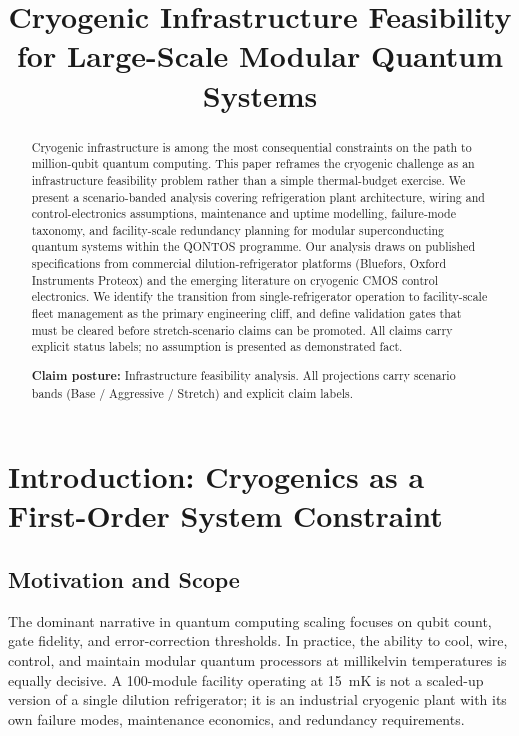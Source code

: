 \documentclass[conference]{IEEEtran}
\begin{document}
\title{Cryogenic Infrastructure Feasibility for Large-Scale Modular Quantum Systems}

\author{\qontosauthor}

\maketitle

\begin{abstract}
Cryogenic infrastructure is among the most consequential constraints on the path to million-qubit quantum computing. This paper reframes the cryogenic challenge as an infrastructure feasibility problem rather than a simple thermal-budget exercise. We present a scenario-banded analysis covering refrigeration plant architecture, wiring and control-electronics assumptions, maintenance and uptime modelling, failure-mode taxonomy, and facility-scale redundancy planning for modular superconducting quantum systems within the QONTOS programme. Our analysis draws on published specifications from commercial dilution-refrigerator platforms (Bluefors, Oxford Instruments Proteox) and the emerging literature on cryogenic CMOS control electronics. We identify the transition from single-refrigerator operation to facility-scale fleet management as the primary engineering cliff, and define validation gates that must be cleared before stretch-scenario claims can be promoted. All claims carry explicit status labels; no assumption is presented as demonstrated fact.

\textbf{Claim posture:} Infrastructure feasibility analysis. All projections carry scenario bands (Base / Aggressive / Stretch) and explicit claim labels.
\end{abstract}

\section{Introduction: Cryogenics as a First-Order System Constraint}

\subsection{Motivation and Scope}

The dominant narrative in quantum computing scaling focuses on qubit count, gate fidelity, and error-correction thresholds. In practice, the ability to cool, wire, control, and maintain modular quantum processors at millikelvin temperatures is equally decisive. A 100-module facility operating at 15~mK is not a scaled-up version of a single dilution refrigerator; it is an industrial cryogenic plant with its own failure modes, maintenance economics, and redundancy requirements.
\end{document}
